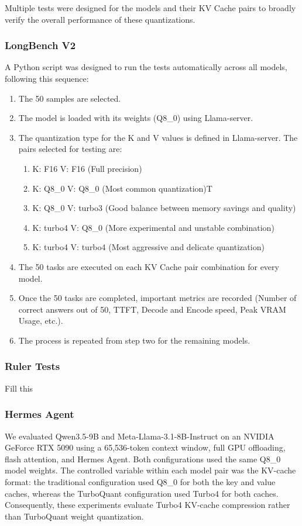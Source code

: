 \documentclass{article}
\begin{document}
Multiple tests were designed for the models and their KV Cache pairs to broadly verify the overall performance of these quantizations.
\subsubsection{LongBench V2}
A Python script was designed to run the tests automatically across all models, following this sequence:
\begin{enumerate}
  \item The 50 samples are selected.
  \item The model is loaded with its weights (Q8\_0) using Llama-server.
  \item The quantization type for the K and V values is defined in Llama-server. The pairs selected for testing are:
    \begin{enumerate}
    \item K: F16 V: F16 (Full precision)
    \item K: Q8\_0 V: Q8\_0 (Most common quantization)T
    \item K: Q8\_0 V: turbo3 (Good balance between memory savings and quality)
    \item K: turbo4 V: Q8\_0 (More experimental and unstable combination)
    \item K: turbo4 V: turbo4 (Most aggressive and delicate quantization)
    \end{enumerate}
  \item The 50 tasks are executed on each KV Cache pair combination for every model.
  \item Once the 50 tasks are completed, important metrics are recorded (Number of correct answers out of 50, TTFT, Decode and Encode speed, Peak VRAM Usage, etc.).
  \item The process is repeated from step two for the remaining models.
\end{enumerate}

\subsubsection{Ruler Tests}

Fill this

\subsubsection{Hermes Agent}

We evaluated Qwen3.5-9B and Meta-Llama-3.1-8B-Instruct on an
NVIDIA GeForce RTX 5090 using a 65,536-token context window, full GPU
offloading, flash attention, and Hermes Agent. Both configurations used the
same Q8\_0 model weights. The controlled variable within each model pair was
the KV-cache format: the traditional configuration used Q8\_0 for both the
key and value caches, whereas the TurboQuant configuration used Turbo4 for
both caches. Consequently, these experiments evaluate Turbo4 KV-cache
compression rather than TurboQuant weight quantization.
\end{document}

